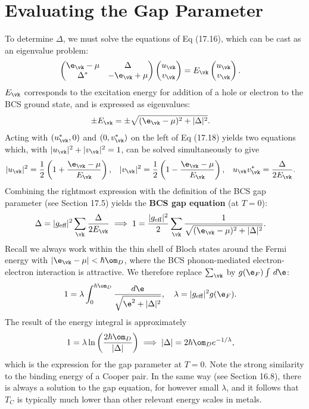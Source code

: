 \documentclass[a4paper, 11pt, normalem]{report}
\begin{document}
\section{Evaluating the Gap Parameter}
To determine $\Delta$, we must solve the equations of Eq (17.16), which can be cast as an eigenvalue problem:
\begin{align}
    \begin{pmatrix} \e_{\vk}-\mu & \Delta \\ \Delta^* & -\e_{\vk}+\mu\end{pmatrix}\begin{pmatrix}u_{\vk} \\ v_{\vk}\end{pmatrix} &= E_{\vk}\begin{pmatrix}u_{\vk} \\ v_{\vk}\end{pmatrix}.
\end{align}
$E_{\vk}$ corresponds to the excitation energy for addition of a hole or electron to the BCS ground state, and is expressed as eigenvalues:
\begin{align}
    \pm E_{\vk} &= \pm\sqrt{(\e_{\vk}-\mu)^2+|\Delta|^2}.
\end{align}
Acting with $(u_{\vk}^*,0)$ and $(0,v_{\vk}^*)$ on the left of Eq (17.18) yields two equations which, with $|u_{\vk}|^2+|v_{\vk}|^2=1$, can be solved simultaneously to give
\begin{align}
    |u_{\vk}|^2 &= \frac12\left(1+\frac{\e_{\vk}-\mu}{E_{\vk}}\right), & |v_{\vk}|^2 &= \frac12\left(1-\frac{\e_{\vk}-\mu}{E_{\vk}}\right), & u_{\vk}v_{\vk}^* &= \frac{\Delta}{2E_{\vk}}.
\end{align}
Combining the rightmost expression with the definition of the BCS gap parameter (see Section 17.5) yields the \textbf{BCS gap equation} (at $T=0$):
\begin{align}
    \Delta &= |g_{\text{eff}}|^2\sum_{\vk}\frac{\Delta}{2E_{\vk}} \implies 1 = \frac{|g_{\text{eff}}|^2}{2}\sum_{\vk}\frac{1}{\sqrt{(\e_{\vk}-\mu)^2+|\Delta|^2}}.
\end{align}
Recall we always work within the thin shell of Bloch states around the Fermi energy with $|\e_{\vk}-\mu|<\hbar\om_D$, where the BCS phonon-mediated electron-electron interaction is attractive.
We therefore replace $\sum_{\vk}$ by $g(\e_F)\int\,d\e$:
\begin{align}
    1 &= \lambda \int_0^{\hbar\om_D} \frac{d\e}{\sqrt{\e^2+|\Delta|^2}},\quad \lambda = |g_{\text{eff}}|^2g(\e_F).
\end{align}
The result of the energy integral is approximately
\begin{align}
    1 &= \lambda\ln\left(\frac{2\hbar\om_D}{|\Delta|}\right) \implies |\Delta| = 2\hbar\om_De^{-1/\lambda},
\end{align}
which is the expression for the gap parameter at $T=0$.
Note the strong similarity to the binding energy of a Cooper pair.
In the same way (see Section 16.8), there is always a solution to the gap equation, for however small $\lambda$, and it follows that $T_C$ is typically much lower than other relevant energy scales in metals.
\end{document}
